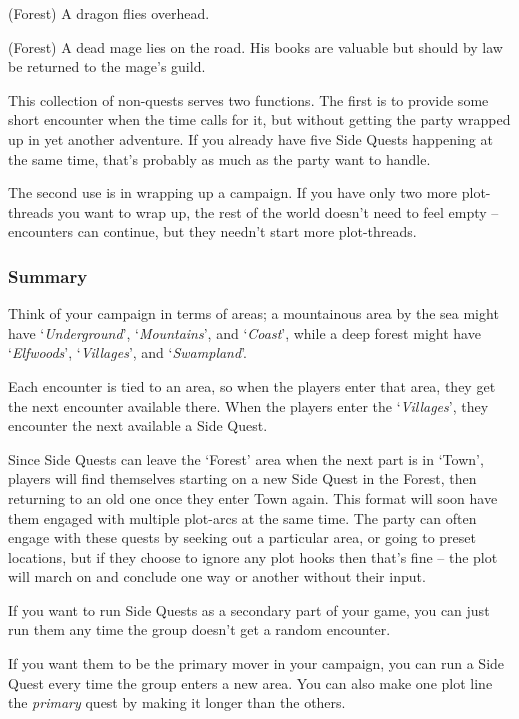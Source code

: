 \begin{multicols}{2}
\begin{list}{\Square}{}
  \item{(Forest) A dragon flies overhead.}

  \item{(Forest) A dead mage lies on the road. His books are valuable but should by law be returned to the mage's guild.}

\end{list}

This collection of non-quests serves two functions.
The first is to provide some short encounter when the time calls for it, but without getting the party wrapped up in yet another adventure.
If you already have five Side Quests happening at the same time, that's probably as much as the party want to handle.

The second use is in wrapping up a campaign.
If you have only two more plot-threads you want to wrap up, the rest of the world doesn't need to feel empty -- encounters can continue, but they needn't start more plot-threads.

\subsubsection{Summary}

Think of your campaign in terms of areas; a mountainous area by the sea might have `\emph{Underground}', `\emph{Mountains}', and `\emph{Coast}', while a deep forest might have `\emph{Elfwoods}', `\emph{Villages}', and `\emph{Swampland}'.

Each encounter is tied to an area, so when the players enter that area, they get the next encounter available there.
When the players enter the `\emph{Villages}', they encounter the next available a Side Quest.

Since Side Quests can leave the `Forest' area when the next part is in `Town', players will find themselves starting on a new Side Quest in the Forest, then returning to an old one once they enter Town again.
This format will soon have them engaged with multiple plot-arcs at the same time.
The party can often engage with these quests by seeking out a particular area, or going to preset locations, but if they choose to ignore any plot hooks then that's fine -- the plot will march on and conclude one way or another without their input.

If you want to run Side Quests as a secondary part of your game, you can just run them any time the group doesn't get a random encounter.

If you want them to be the primary mover in your campaign, you can run a Side Quest every time the group enters a new area.
You can also make one plot line the \emph{primary} quest by making it longer than the others.


\end{multicols}
